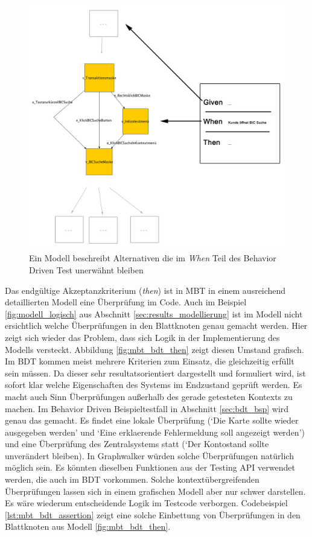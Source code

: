 \begin{figure} 
  \centering
     \includegraphics[width=1\textwidth]{figures/mbt_bdt_when.png}
  \caption{Ein Modell beschreibt Alternativen die im \textit{When} Teil des Behavior Driven Test unerwähnt bleiben}
  \label{fig:mbt_bdt_when}
\end{figure}

Das endgültige Akzeptanzkriterium (\textit{then}) ist in \Gls{MBT} in einem ausreichend detaillierten Modell eine Überprüfung im Code. Auch im Beispiel \ref{fig:modell_logisch} aus Abschnitt \ref{sec:results_modellierung} ist im Modell nicht ersichtlich welche Überprüfungen in den Blattknoten genau gemacht werden. Hier zeigt sich wieder das Problem, dass sich Logik in der Implementierung des Modells versteckt. Abbildung \ref{fig:mbt_bdt_then} zeigt diesen Umstand grafisch. Im \Gls{BDT} kommen meist mehrere Kriterien zum Einsatz, die gleichzeitig erfüllt sein müssen. Da dieser sehr resultatsorientiert dargestellt und formuliert wird, ist sofort klar welche Eigenschaften des Systems im Endzustand geprüft werden. Es macht auch Sinn Überprüfungen außerhalb des gerade getesteten Kontexts zu machen. Im Behavior Driven Beispieltestfall in Abschnitt \ref{sec:bdt_bsp} wird genau das gemacht. Es findet eine lokale Überprüfung (`Die Karte sollte wieder ausgegeben werden' und `Eine erklaerende Fehlermeldung soll angezeigt werden') und eine Überprüfung des Zentralsystems statt (`Der Kontostand sollte unverändert bleiben). In Graphwalker würden solche Überprüfungen natürlich möglich sein. Es könnten dieselben Funktionen aus der Testing API verwendet werden, die auch im \Gls{BDT} vorkommen. Solche kontextübergreifenden Überprüfungen lassen sich in einem grafischen Modell aber nur schwer darstellen. Es wäre wiederum entscheidende Logik im Testcode verborgen. Codebeispiel \ref{lst:mbt_bdt_assertion} zeigt eine solche Einbettung von Überprüfungen in den Blattknoten aus Modell \ref{fig:mbt_bdt_then}.


